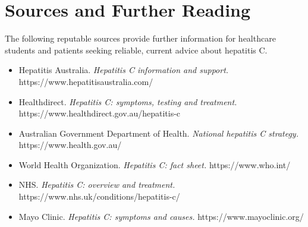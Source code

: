 \section*{Sources and Further Reading}
The following reputable sources provide further information for healthcare students and patients seeking reliable, current advice about hepatitis C.

\begin{itemize}
    \item Hepatitis Australia. \textit{Hepatitis C information and support.} https://www.hepatitisaustralia.com/
    \item Healthdirect. \textit{Hepatitis C: symptoms, testing and treatment.} https://www.healthdirect.gov.au/hepatitis-c
    \item Australian Government Department of Health. \textit{National hepatitis C strategy.} https://www.health.gov.au/
    \item World Health Organization. \textit{Hepatitis C: fact sheet.} https://www.who.int/
    \item NHS. \textit{Hepatitis C: overview and treatment.} https://www.nhs.uk/conditions/hepatitis-c/
    \item Mayo Clinic. \textit{Hepatitis C: symptoms and causes.} https://www.mayoclinic.org/
\end{itemize}
